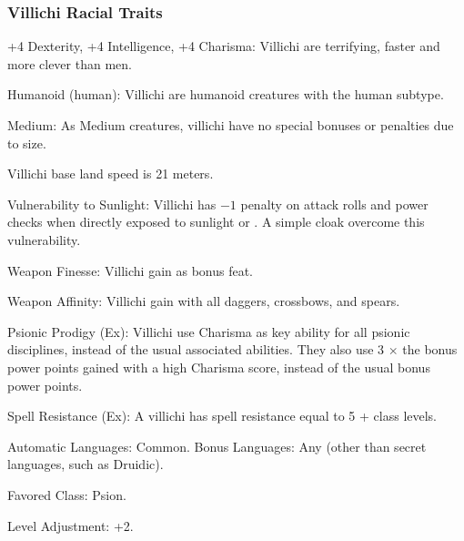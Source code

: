 \subsubsection{Villichi Racial Traits}
\begin{itemize*}
    \item +4 Dexterity, +4 Intelligence, +4 Charisma: Villichi are terrifying, faster and more clever than men.
    \item Humanoid (human): Villichi are humanoid creatures with the human subtype.
    \item Medium: As Medium creatures, villichi have no special bonuses or penalties due to size.
    \item Villichi base land speed is 21 meters.

    \item Vulnerability to Sunlight: Villichi has $-1$ penalty on attack rolls and power checks when directly exposed to sunlight or . A simple cloak overcome this vulnerability.

    \item Weapon Finesse: Villichi gain  as bonus feat.
    \item Weapon Affinity: Villichi gain  with all daggers, crossbows, and spears.

    \item Psionic Prodigy (Ex): Villichi use Charisma as key ability for all psionic disciplines, instead of the usual associated abilities. They also use 3 $\times$ the bonus power points gained with a high Charisma score, instead of the usual bonus power points.
    \item Spell Resistance (Ex): A villichi has spell resistance equal to 5 + class levels.

    \item Automatic Languages: Common. Bonus Languages: Any (other than secret languages, such as Druidic).
    \item Favored Class: Psion.
    \item Level Adjustment: +2.
\end{itemize*}
